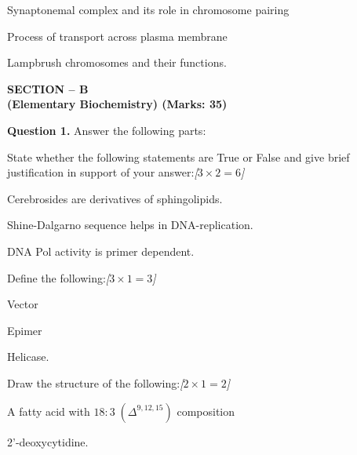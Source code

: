 \documentclass[11pt,a4paper]{article}
\newcommand{\pts}[1]{\hfill   \textit{[#1]}}
\begin{document}
\begin{parts}
  \item Synaptonemal complex and its role in chromosome pairing
  \item Process of transport across plasma membrane
  \item Lampbrush chromosomes and their functions.
\end{parts}

\bigskip

\begin{center}
   \textbf{SECTION -- B} \\
   \textbf{(Elementary Biochemistry) (Marks: 35)}
\end{center}




\noindent   \textbf{Question 1.} Answer the following parts:

\begin{parts}
  \item State whether the following statements are True or False and give brief justification in support of your answer:\pts{$3  \times 2 = 6$}
  
\begin{parts}
    \item Cerebrosides are derivatives of sphingolipids.
    \item Shine-Dalgarno sequence helps in DNA-replication.
    \item DNA Pol activity is primer dependent.
  \end{parts}
  
  \item Define the following:\pts{$3  \times 1 = 3$}
  
\begin{parts}
    \item Vector
    \item Epimer
    \item Helicase.
  \end{parts}
  
  \item Draw the structure of the following:\pts{$2  \times 1 = 2$}
  
\begin{parts}
    \item A fatty acid with $18:3 \; (\Delta^{9, 12, 15})$ composition
    \item 2'-deoxycytidine.
  \end{parts}
\end{parts}
\end{document}

